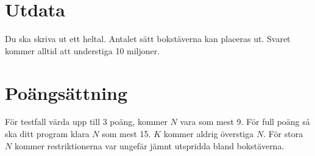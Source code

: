 \section*{Utdata}

Du ska skriva ut ett heltal. Antalet sätt bokstäverna kan
placeras ut. Svaret kommer alltid att understiga 10 miljoner.

\section*{Poängsättning}

För testfall värda upp till $3$ poäng, kommer $N$ vara som mest 9. För full
poäng så ska ditt program klara $N$ som mest 15. $K$ kommer aldrig överstiga $N$.
För stora $N$ kommer restriktionerna var ungefär jämnt utspridda bland
bokstäverna.
